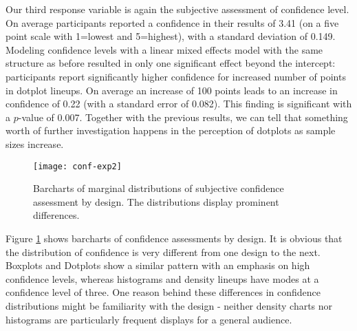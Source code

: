 Our third response variable is again the subjective assessment of confidence level. On average participants reported a confidence in their results of  3.41 (on a five point scale with 1=lowest and 5=highest), with a standard deviation of 0.149. Modeling confidence levels with a linear mixed effects model with the same structure as before resulted in only one significant effect beyond the intercept: participants report significantly higher confidence for increased number of  points in dotplot lineups. On average an increase of 100 points leads to an increase in confidence of 0.22 (with a standard error of 0.082). This finding is significant with a $p$-value of 0.007. 
Together with the previous results, we can tell that something worth of further investigation happens in the perception of dotplots as sample sizes increase. 


\begin{figure}[htbp] %
   \centering
   \texttt{[image: conf-exp2]} 
   \caption{Barcharts of marginal distributions of subjective confidence assessment by design. The distributions display prominent differences.}
   \label{fig:conf-margins}
\end{figure}

Figure \ref{fig:conf-margins} shows barcharts of confidence assessments by design. It is obvious that the distribution of confidence is very different from one design to the next. Boxplots and Dotplots show a similar pattern with an emphasis on high confidence levels, whereas histograms and density lineups have modes at a confidence level of three. One reason behind these differences in confidence distributions might be familiarity with the design - neither density charts nor histograms are particularly frequent displays for a general audience. 


